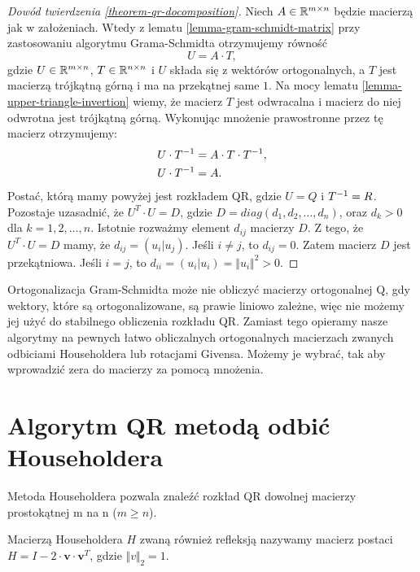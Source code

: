 \documentclass[12pt,a4paper]{report}
\newcommand{\vr}[1]{\mathbf{#1}}
\newcommand{\mx}[1]{{#1}}
\begin{document}
\begin{proof}[Dowód twierdzenia \ref{theorem-qr-docomposition}]
Niech $\mx{A} \in \setR^{m \times n}$ będzie macierzą jak w założeniach. Wtedy z lematu \ref{lemma-gram-schmidt-matrix} przy zastosowaniu algorytmu Grama-Schmidta otrzymujemy równość
$$
\mx{U} = \mx{A} \cdot \mx{T},
$$  
gdzie $\mx{U} \in \setR^{m \times n}$, $\mx{T} \in \setR^{n \times n}$ i $\mx{U}$ składa się z wektórów ortogonalnych, a $\mx{T}$ jest macierzą trójkątną górną i ma na przekątnej same $1$.  
Na mocy lematu \ref{lemma-upper-triangle-invertion} wiemy, że macierz $\mx{T}$ jest odwracalna i macierz do niej odwrotna jest trójkątną górną. Wykonując mnożenie prawostronne przez tę macierz otrzymujemy:
\begin{align*}
\mx{U} \cdot \inverse{\mx{T}} & = \mx{A}\cdot\mx{T}\cdot \inverse{\mx{T}}, \\
\mx{U} \cdot \inverse{\mx{T}} & = \mx{A}.
\end{align*}  
Postać, którą mamy powyżej jest rozkładem QR, gdzie $\mx{U} = \mx{Q}$ i $\inverse{\mx{T}} = \mx{R}$. Pozostaje uzasadnić, że $\mx{U}^{T} \cdot \mx{U} = \mx{D}$, gdzie $D= diag (d_{1}, d_{2}, ..., d_{n})$, oraz $d_{k}>0$ dla $k = 1, 2, \ldots, n$. Istotnie rozważmy element $d_{ij}$ macierzy $\mx{D}$. Z tego, że $\mx{U}^{T} \cdot \mx{U} = \mx{D}$ mamy, że $d_{ij} = (u_{i}|u_{j})$. Jeśli $i \neq j$, to $d_{ij}=0$. Zatem macierz $\mx{D}$ jest przekątniowa. Jeśli $i=j$, to $d_{ii}=(u_{i}|u_{i}) = \Vert u_{i} \Vert ^{2} >0$.

\end{proof}



Ortogonalizacja Gram-Schmidta może nie obliczyć macierzy ortogonalnej Q, gdy wektory, które są ortogonalizowane, są prawie liniowo zależne, więc nie możemy jej użyć do stabilnego obliczenia rozkładu QR. Zamiast tego opieramy nasze algorytmy na pewnych łatwo obliczalnych ortogonalnych macierzach zwanych odbiciami Householdera lub rotacjami Givensa. Możemy je wybrać, tak aby wprowadzić zera do macierzy za pomocą mnożenia.


\section{Algorytm QR metodą odbić Householdera}

Metoda Householdera pozwala znaleźć rozkład QR dowolnej macierzy prostokątnej m na n ($m\ge n$).

\begin{definition}
Macierzą Householdera $H$ zwaną również refleksją nazywamy macierz postaci $\mx{H}=\mx{I}-2\cdot \vr{v}\cdot \vr{v}^{T}$, gdzie $\Vert v \Vert_{2} = 1$.
\end{definition}
\end{document}
